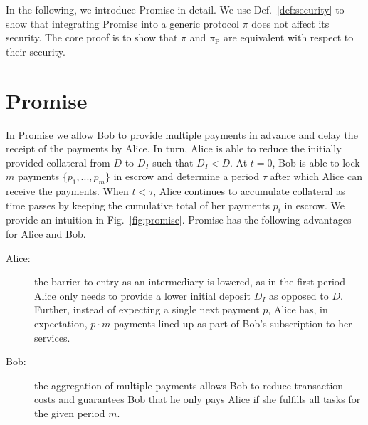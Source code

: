 \documentclass[runningheads]{llncs}
\newcommand{\sys}{Promise\xspace}
\begin{document}
In the following, we introduce \sys in detail.
We use Def.~\ref{def:security} to show that integrating \sys into a generic protocol $\pi$ does not affect its security.
The core proof is to show that $\pi$ and $\pi_{\mathrm{P}}$ are equivalent with respect to their security.


\section{\sys}
\label{sec:promise}


In \sys we allow Bob to provide multiple payments in advance and delay the receipt of the payments by Alice.
In turn, Alice is able to reduce the initially provided collateral from $D$ to $D_I$ such that $D_I < D$.
At $t=0$, Bob is able to lock $m$ payments $\{p_1, ..., p_{m}\}$ in escrow and determine a period $\tau$ after which Alice can receive the payments.
When $t < \tau$, Alice continues to accumulate collateral as time passes by keeping the cumulative total of her payments $p_i$ in escrow. 
We provide an intuition in Fig.~\ref{fig:promise}.
\sys has the following advantages for Alice and Bob. 

\begin{description}
    \item[Alice:] the barrier to entry as an intermediary is lowered, as in the first period Alice only needs to provide a lower initial deposit $D_I$ as opposed to $D$. Further, instead of expecting a single next payment $p$, Alice has, in expectation, $p \cdot m$ payments lined up as part of Bob's subscription to her services.
    \item[Bob:] the aggregation of multiple payments allows Bob to reduce transaction costs and guarantees Bob that he only pays Alice if she fulfills all tasks for the given period $m$.
\end{description}
\end{document}
